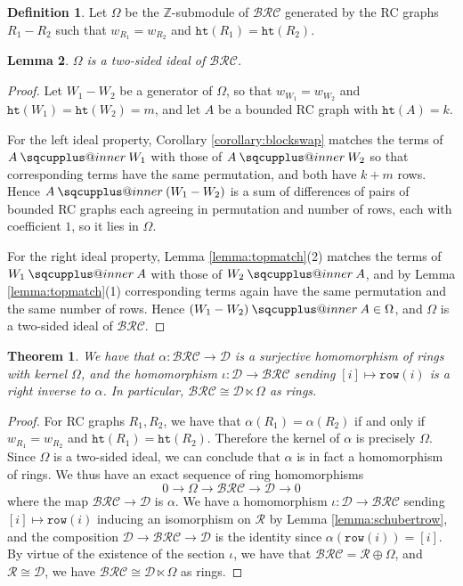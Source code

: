 \documentclass{amsart}
\makeatletter
\newcommand{\sqcupplus@inner}[2]{%
  \vcenter{\hbox{\ooalign{%
    \hfil$\m@th#1\sqcup$\hfil\cr
    \hfil\raisebox{0.15ex}{$\m@th#1\scriptscriptstyle+$}\hfil\cr
  }}}%
}
\newcommand{\sqcupplus}{\mathbin{\mathpalette\sqcupplus@inner\relax}}
\newtheorem{lemma}{Lemma}[subsection]
\newtheorem{theorem}{Theorem}[section]
\theoremstyle{definition}
\newtheorem{definition}[lemma]{Definition}
\theoremstyle{remark}
\numberwithin{equation}{subsection}
\newcommand{\wof}[1]{w_{#1}}
\newcommand{\hr}{\mathtt{ht}}
\newcommand{\BRC}{\mathcal{BRC}}
\newcommand{\dcoma}{\mathcal{D}}
\makeatother
\begin{document}
\begin{definition}\label{definition:omega}
Let $\Omega$ be the $\mathbb{Z}$-submodule of $\BRC$ generated by the RC graphs $R_1-R_2$ such that $\wof{R_1}=\wof{R_2}$ and $\hr(R_1)=\hr(R_2)$.
\end{definition}

\begin{lemma}
$\Omega$ is a two-sided ideal of $\BRC$.
\end{lemma}
\begin{proof}
Let $W_1-W_2$ be a generator of $\Omega$, so that $\wof{W_1}=\wof{W_2}$ and $\hr(W_1)=\hr(W_2)=m$, and let $A$ be a bounded RC graph with $\hr(A)=k$.

For the left ideal property, Corollary \ref{corollary:blockswap} matches the terms of $A\sqcupplus W_1$ with those of $A\sqcupplus W_2$ so that corresponding terms have the same permutation, and both have $k+m$ rows. Hence $A\sqcupplus(W_1-W_2)$ is a sum of differences of pairs of bounded RC graphs each agreeing in permutation and number of rows, each with coefficient $1$, so it lies in $\Omega$.

For the right ideal property, Lemma \ref{lemma:topmatch}(2) matches the terms of $W_1\sqcupplus A$ with those of $W_2\sqcupplus A$, and by Lemma \ref{lemma:topmatch}(1) corresponding terms again have the same permutation and the same number of rows. Hence $(W_1-W_2)\sqcupplus A\in\Omega$, and $\Omega$ is a two-sided ideal of $\BRC$.
\end{proof}

\begin{theorem} \label{theorem:semidirect}
  We have that $\alpha:\BRC\to \dcoma$ is a surjective homomorphism of rings with kernel $\Omega$, and the homomorphism $\iota:\dcoma\to\BRC$ sending $[i]\mapsto \mathtt{row}(i)$ is a right inverse to $\alpha$. In particular, $\BRC\cong \dcoma\ltimes \Omega$ as rings.
\end{theorem}
\begin{proof}
  For RC graphs $R_1,R_2$, we have that $\alpha(R_1)=\alpha(R_2)$ if and only if $\wof{R_1}=\wof{R_2}$ and $\hr(R_1)=\hr(R_2)$. Therefore the kernel of $\alpha$ is precisely $\Omega$. Since $\Omega$ is a two-sided ideal, we can conclude that $\alpha$ is in fact a homomorphism of rings. We thus have an exact sequence of ring homomorphisms
$$0\to \Omega\to \BRC\to \dcoma\to 0$$
where the map $\BRC\to \dcoma$ is $\alpha$. We have a homomorphism $\iota:\dcoma\to \BRC$ sending $[i]\mapsto \mathtt{row}(i)$ inducing an isomorphism on $\mathcal{R}$ by Lemma \ref{lemma:schubertrow}, and the composition $\dcoma\to \BRC\to \dcoma$ is the identity since $\alpha(\mathtt{row}(i)) = [i]$.  By virtue of the existence of the section $\iota$, we have that $\BRC = \mathcal{R}\oplus \Omega$, and $\mathcal{R}\cong \dcoma$, we have $\BRC\cong \dcoma\ltimes \Omega$ as rings.
\end{proof}
\end{document}
